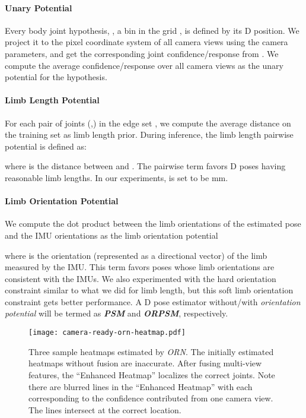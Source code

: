 \documentclass[10pt,twocolumn,letterpaper]{article}
\begin{document}
\paragraph{Unary Potential} Every body joint hypothesis, \ie, a bin in the grid , is defined by its D position. We project it to the pixel coordinate system of all camera views using the camera parameters, and get the corresponding joint confidence/response from . We compute the average confidence/response over all camera views as the unary potential for the hypothesis.




\paragraph{Limb Length Potential}
For each pair of joints (,) in the edge set , we compute the average distance  on the training set as limb length prior. During inference, the limb length pairwise potential is defined as:

where  is the distance between  and .
The pairwise term favors D poses having reasonable limb lengths. In our experiments,  is set to be mm.



\paragraph{Limb Orientation Potential}
We compute the dot product between the limb orientations of the estimated pose and the IMU orientations as the limb orientation potential

where  is the orientation (represented as a directional vector) of the limb measured by the IMU. This term favors poses whose limb orientations are consistent with the IMUs. We also experimented with the hard orientation constraint similar to what we did for limb length, but this soft limb orientation constraint gets better performance. A D pose estimator without/with \emph{orientation potential} will be termed as \textbf{\emph{PSM}} and \textbf{\emph{ORPSM}}, respectively.


\begin{figure}[ht]
\centering
\texttt{[image: camera-ready-orn-heatmap.pdf]}
\caption{Three sample heatmaps estimated by \emph{ORN}. The initially estimated heatmaps without fusion are inaccurate. After fusing multi-view features, the ``Enhanced Heatmap'' localizes the correct joints. Note there are blurred lines in the ``Enhanced Heatmap'' with each corresponding to the confidence contributed from one camera view. The lines intersect at the correct location.}
\label{fig:visualization_hm}
\end{figure}
\end{document}

